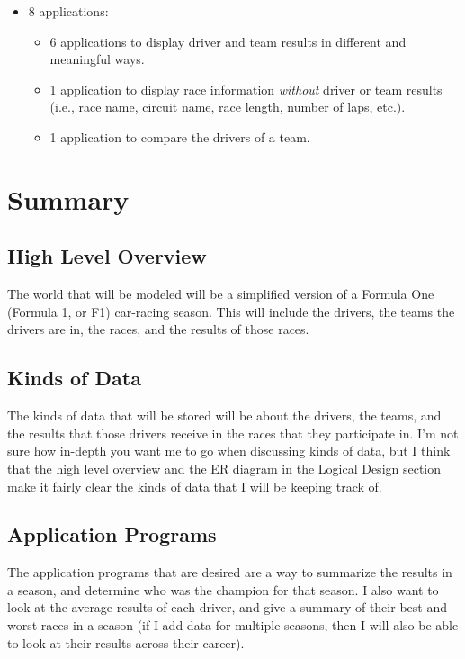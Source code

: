 \documentclass{article} %
\begin{document}
\begin{itemize}
\begin{itemize}
        \item 8 applications:
        \begin{itemize}
            \item 6 applications to display driver and team results in
            different and meaningful ways.

            \item 1 application to display race information
            \textit{without} driver or team results (i.e., race name, circuit
            name, race length, number of laps, etc.).

            \item 1 application to compare the drivers of a team.
        \end{itemize}
    \end{itemize}
\end{itemize}

\section{Summary}

\subsection{High Level Overview}
The world that will be modeled will be a simplified version of a Formula
One (Formula 1, or F1) car-racing season. This will include the drivers, the teams the
drivers are in, the races, and the results of those races. 

\subsection{Kinds of Data}
The kinds of data that will be stored will be about the drivers, the
teams, and the results that those drivers receive in the races that they
participate in. I'm not sure how in-depth you want me to go when
discussing kinds of data, but I think that the high level overview and
the ER diagram in the Logical Design section make it fairly clear the
kinds of data that I will be keeping track of. 

\subsection{Application Programs}
The application programs that are desired are a way to summarize the
results in a season, and determine who was the champion for that season.
I also want to look at the average results of each driver, and give a
summary of their best and worst races in a season (if I add data for
multiple seasons, then I will also be able to look at their results
across their career).
\end{document}

